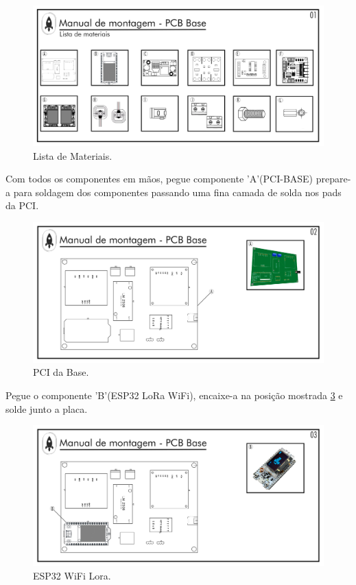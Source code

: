 \begin{figure}[H]
  \centering
\includegraphics[width=\textwidth]{Figuras/BASE/Pg-01---PL-03.png}
  \caption{Lista de Materiais.} 
 \label{fig:Lista de materiasi base}
 \end{figure}


 \par Com todos os componentes em mãos, pegue componente 'A'(PCI-BASE) prepare-a para soldagem dos componentes passando uma fina camada de solda nos pads da PCI.

\begin{figure}[H]
  \centering
  \includegraphics[width=\textwidth]{Figuras/BASE/Pg-02---PL-03.png}
  \caption{PCI da Base.}
  \label{fig:PCIBASE}
\end{figure}

\newpage
\par Pegue o componente 'B'(ESP32 LoRa WiFi), encaixe-a na posição mostrada \ref{fig:PCIBASE LORA} e solde junto a placa.
\begin{figure}[H]
  \centering
  \includegraphics[width=\textwidth]{Figuras/BASE/Pg-03---PL-03.png}
  \caption{ESP32 WiFi Lora.}
  \label{fig:PCIBASE LORA}
\end{figure}



